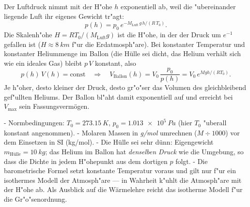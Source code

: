 \begin{werkzeugkasten}
Der Luftdruck nimmt mit der H"ohe $h$ exponentiell ab, weil die "ubereinander
liegende Luft ihr eigenes Gewicht tr"agt:
\begin{equation}
  p(h)=p_0\,e^{-M_{\mathrm{Luft}}\,g\,h/(R\,T_0)}.
\end{equation}
Die Skalenh"ohe $H=R T_0/(M_{\mathrm{Luft}} g)$ ist die H"ohe, in der der
Druck um $e^{-1}$ gefallen ist ($H\approx\qty{8}{km}$ f"ur die
Erdatmosph"are). Bei konstanter Temperatur und konstanter Heliummenge im
Ballon (die Hülle sei dicht, das Helium verhält sich wie ein ideales Gas)
bleibt $p\,V$ konstant, also
\begin{equation}
  p(h)\,V(h)=\mathrm{const}\quad\Rightarrow\quad
  V_{\mathrm{Ballon}}(h)=V_0\,\frac{p_0}{p(h)}=V_0\,e^{M g h/(R T_0)}.
\end{equation}
Je h"oher, desto kleiner der Druck, desto gr"o"ser das Volumen des
gleichbleibend gef"ullten Heliums. Der Ballon bl"aht damit exponentiell auf
und erreicht bei $V_{\max}$ sein Fassungsvermögen.
\end{werkzeugkasten}

\begin{achtung}
- Normbedingungen: $T_0=\qty{273.15}{K}$, $p_0=\qty{1.013e5}{Pa}$
  (hier $T_0$ "uberall konstant angenommen).
- Molaren Massen in \emph{g/mol} umrechnen ($M\div1000$) vor dem Einsetzen
  in SI (kg/mol).
- Die Hülle sei sehr dünn: Eigengewicht $m_{\mathrm{Hülle}}=\qty{10}{kg}$;
  das Helium im Ballon hat \emph{denselben Druck} wie die Umgebung, so dass
  die Dichte in jedem H"ohepunkt aus dem dortigen $p$ folgt.
- Die barometrische Formel setzt konstante Temperatur voraus und gilt nur
  f"ur ein isothermes Modell der Atmosph"are --- in Wahrheit k"uhlt die
  Atmosph"are mit der H"ohe ab. Als Ausblick auf die Wärmelehre reicht das
  isotherme Modell f"ur die Gr"o"senordnung.
\end{achtung}
